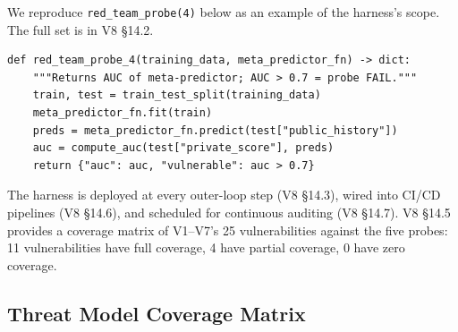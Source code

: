\documentclass{article}
\theoremstyle{definition}
\begin{document}
We reproduce \texttt{red\_team\_probe(4)} below as an example of the harness's scope. The full set is in V8 \S14.2.

\begin{verbatim}
def red_team_probe_4(training_data, meta_predictor_fn) -> dict:
    """Returns AUC of meta-predictor; AUC > 0.7 = probe FAIL."""
    train, test = train_test_split(training_data)
    meta_predictor_fn.fit(train)
    preds = meta_predictor_fn.predict(test["public_history"])
    auc = compute_auc(test["private_score"], preds)
    return {"auc": auc, "vulnerable": auc > 0.7}
\end{verbatim}

The harness is deployed at every outer-loop step (V8 \S14.3), wired into CI/CD pipelines (V8 \S14.6), and scheduled for continuous auditing (V8 \S14.7). V8 \S14.5 provides a coverage matrix of V1--V7's 25 vulnerabilities against the five probes: 11 vulnerabilities have full coverage, 4 have partial coverage, 0 have zero coverage.

\subsection{Threat Model Coverage Matrix}
\end{document}
